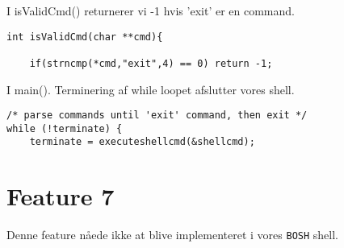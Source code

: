 \documentclass[danish]{report}
\begin{document}
I isValidCmd() returnerer vi -1 hvis 'exit' er en command.
\begin{lstlisting}
int isValidCmd(char **cmd){
	
	if(strncmp(*cmd,"exit",4) == 0) return -1;
\end{lstlisting}

I main(). Terminering af while loopet afslutter vores shell. 
\begin{lstlisting}
/* parse commands until 'exit' command, then exit */
while (!terminate) {
	terminate = executeshellcmd(&shellcmd);
\end{lstlisting}

\section{Feature 7}

Denne feature nåede ikke at blive implementeret i vores {\tt BOSH} shell.
\end{document}
